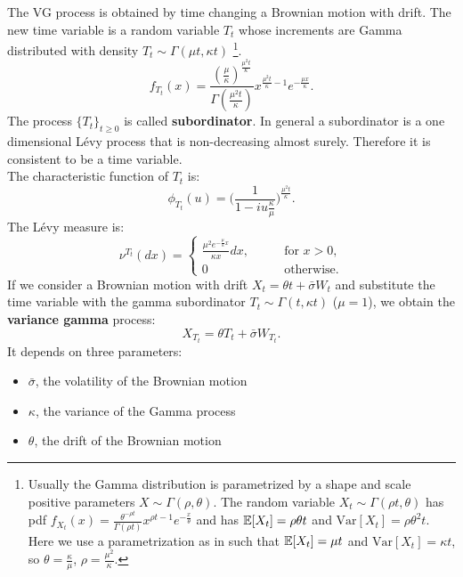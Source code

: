 The VG process is obtained by time changing a Brownian motion with drift. The new time variable is a random variable 
$T_t$ whose increments are Gamma distributed with density $T_t \sim \Gamma(\mu t,\kappa t)$ \footnote{Usually the Gamma distribution is 
parametrized by a shape and scale positive parameters $X \sim \Gamma(\rho,\theta)$. The random variable $X_t \sim \Gamma(\rho t,\theta)$ 
has pdf 
$f_{X_t}(x) = \frac{\theta^{-\rho t}}{\Gamma(\rho t)}x^{\rho t -1}e^{-\frac{x}{\theta}}$ and has $\mathbb{E}[X_t]=\rho \theta t$ 
and $\mbox{Var}[X_t] = \rho \theta^2 t$. Here we use a parametrization as in \cite{MCC98} such that $\mathbb{E}[X_t]=\mu t$ and $\mbox{Var}
[X_t] = \kappa t$, so $\theta=\frac{\kappa}{\mu}$, $\rho=\frac{\mu^2}{\kappa}$.}.
\begin{equation}
 f_{T_t}(x)= \frac{(\frac{\mu}{\kappa})^{\frac{\mu^2 t}{\kappa}}}{\Gamma(\frac{\mu^2 t}{\kappa})}x^{\frac{\mu^2 t}{\kappa} -1}
 e^{-\frac{\mu x}{\kappa}}.
\end{equation}
The process $\{T_t\}_{t\geq0}$ is called \textbf{subordinator}. In general a subordinator is a one dimensional Lévy process that is 
non-decreasing almost surely. Therefore it is consistent to be a time variable.\\
The characteristic function of $T_t$ is:
\begin{equation}
 \phi_{T_t}(u) = \biggl( \frac{1}{1-iu\frac{\kappa}{\mu}} \biggr)^{\frac{\mu^2 t}{\kappa}} . 
\end{equation}
The Lévy measure is:
\begin{equation}
 \nu^{T_t}(dx) = \begin{cases}
            \frac{\mu^2 e^{-\frac{\mu}{\kappa}x}}{\kappa x} dx, & \hspace{2em} \mbox{for } x>0,\\
            0 & \hspace{2em} \mbox{otherwise.}
           \end{cases}
\end{equation}
\newline
If we consider a Brownian motion with drift $X_t = \theta t + \bar\sigma W_t$ and substitute the time variable with the gamma subordinator
$T_t \sim \Gamma(t,\kappa t)$ ($\mu=1$),
we obtain the \textbf{variance gamma} process:
\begin{equation}\label{VG_process}
 X_{T_t} = \theta T_t + \bar\sigma W_{T_t} .
\end{equation}
It depends on three parameters:
\begin{itemize}
 \item $\bar\sigma$, the volatility of the Brownian motion
 \item $\kappa$, the variance of the Gamma process
 \item $\theta$, the drift of the Brownian motion
\end{itemize}
